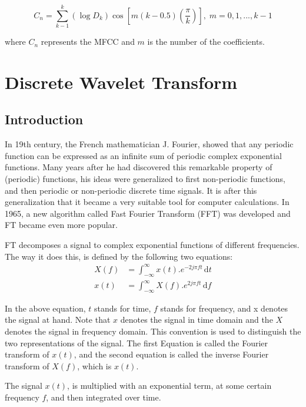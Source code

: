\documentclass[12pt, a4paper, twoside]{report}
\begin{document}
\begin{equation*}
C_n = \sum_{k-1}^{k}\left ( \log D_k \right )\cos \left [ m(k-0.5) \left ( \frac{\pi}{k} \right ) \right ], \; m=0,1,...,k-1
\end{equation*}

where $C_n$ represents the MFCC and $m$ is the number of the coefficients.

\section{Discrete Wavelet Transform}
\subsection{Introduction}
In 19th century, the French mathematician J. Fourier, showed that any periodic function can be expressed as an infinite sum of periodic complex exponential functions. Many years after he had discovered this remarkable property of (periodic) functions, his ideas were generalized to first non-periodic functions, and then periodic or non-periodic discrete time signals. It is after this generalization that it became a very suitable tool for computer calculations. In 1965, a new algorithm called Fast Fourier Transform (FFT) was developed and FT became even more popular.
\par
FT decomposes a signal to complex exponential functions of different frequencies. The way it does this, is defined by the following two equations:
\begin{align}
X(f) &= \int_{-\infty}^{\infty} x(t) . e^{-2j\pi ft} \, \text{d}t \label{eq:fourier-transform} \\
x(t) &= \int_{-\infty}^{\infty} X(f) . e^{2j\pi ft} \, \text{d}f \nonumber
\end{align}

In the above equation, $t$ stands for time, $f$ stands for frequency, and x denotes the signal at hand. Note that $x$ denotes the signal in time domain and the $X$ denotes the signal in frequency domain. This convention is used to distinguish the two representations of the signal. The first Equation is called the Fourier transform of $x(t)$, and the second equation is called the inverse Fourier transform of $X(f)$, which is $x(t)$.
\par
The signal $x(t)$, is multiplied with an exponential term, at some certain frequency $f$, and then integrated over time.
\end{document}
